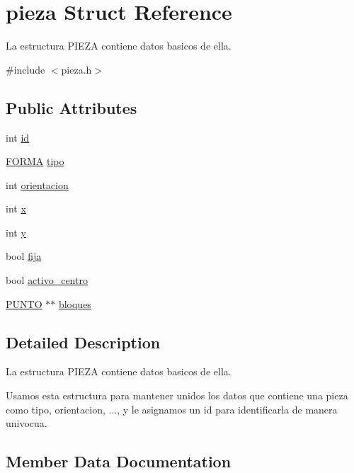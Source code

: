 \hypertarget{structpieza}{}\section{pieza Struct Reference}
\label{structpieza}


La estructura P\+I\+E\+ZA contiene datos basicos de ella.  




{\ttfamily \#include $<$pieza.\+h$>$}

\subsection*{Public Attributes}
\begin{DoxyCompactItemize}
\item 
int \hyperlink{structpieza_a0cc98244d594b50de5403ac3f7f5717b}{id}
\item 
\hyperlink{pieza_8h_adbcefcc94834b3c1042f11047ccd90ef}{F\+O\+R\+MA} \hyperlink{structpieza_a1633f17539310c67d0dcc8264891b051}{tipo}
\item 
int \hyperlink{structpieza_ae2a1a9d087e978703430788ceec169c1}{orientacion}
\item 
int \hyperlink{structpieza_a39b0a2d6772ef76714341486dadb0270}{x}
\item 
int \hyperlink{structpieza_a2cfe46c03638f670ad342054e680fc17}{y}
\item 
bool \hyperlink{structpieza_a07cee970ed403863a97c571019bf4fe9}{fija}
\item 
bool \hyperlink{structpieza_a6fef79792ec0ad2848d49d67fe87b7d1}{activo\+\_\+centro}
\item 
\hyperlink{pieza_8h_a3b9c719c4c783cb9f96e4491fc254368}{P\+U\+N\+TO} $\ast$$\ast$ \hyperlink{structpieza_a7571487b8b7378bdc9375be059264df3}{bloques}
\end{DoxyCompactItemize}


\subsection{Detailed Description}
La estructura P\+I\+E\+ZA contiene datos basicos de ella. 

Usamos esta estructura para mantener unidos los datos que contiene una pieza como tipo, orientacion, ..., y le asignamos un id para identificarla de manera univocua. 

\subsection{Member Data Documentation}
\mbox{\label{structpieza_a6fef79792ec0ad2848d49d67fe87b7d1}} 
